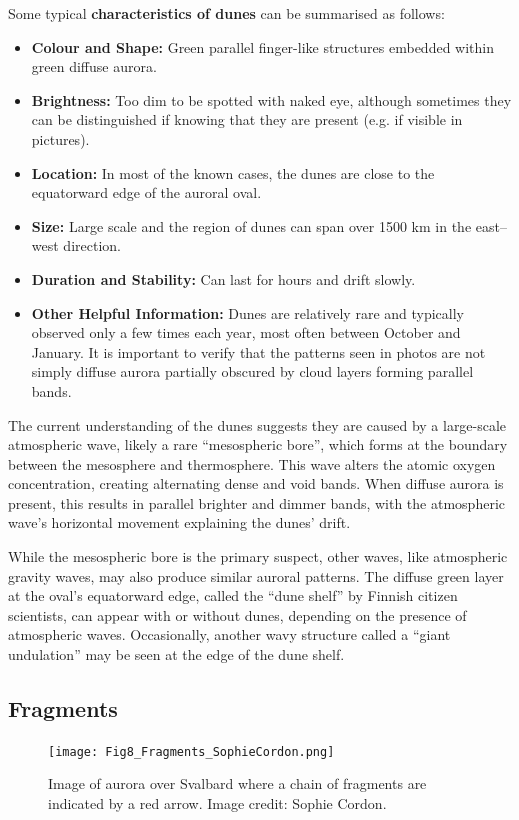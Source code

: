 \documentclass{article}
\newcommand{\contributed}[1]{%
    \par\noindent
    \begingroup
    \setlength{\leftskip}{1em}%
    \itshape
    Contributors: #1
    \par
    \endgroup
    \vspace{0.5em}
}
\begin{document}
Some typical {\bf characteristics of dunes} can be summarised as follows:
\begin{itemize}
    \item \textbf{Colour and Shape:} Green parallel finger-like structures embedded within green diffuse aurora.
    \item \textbf{Brightness:} Too dim to be spotted with naked eye, although sometimes they can be distinguished if knowing that they are present (e.g. if visible in pictures).
    \item \textbf{Location:} In most of the known cases, the dunes are close to the equatorward edge of the auroral oval.
    \item \textbf{Size:} Large scale and the region of dunes can span over 1500 km in the east--west direction.
    \item \textbf{Duration and Stability:} Can last for hours and drift slowly. 
    \item \textbf{Other Helpful Information:} Dunes are relatively rare and typically observed only a few times each year, most often between October and January. It is important to verify that the patterns seen in photos are not simply diffuse aurora partially obscured by cloud layers forming parallel bands.
    \end{itemize}

The current understanding of the dunes suggests they are caused by a large-scale atmospheric wave, likely a rare ``mesospheric bore'', which forms at the boundary between the mesosphere and thermosphere. This wave alters the atomic oxygen concentration, creating alternating dense and void bands. When diffuse aurora is present, this results in parallel brighter and dimmer bands, with the atmospheric wave’s horizontal movement explaining the dunes' drift.

While the mesospheric bore is the primary suspect, other waves, like atmospheric gravity waves, may also produce similar auroral patterns. The diffuse green layer at the oval's equatorward edge, called the ``dune shelf'' by Finnish citizen scientists, can appear with or without dunes, depending on the presence of atmospheric waves. Occasionally, another wavy structure called a ``giant undulation'' may be seen at the edge of the dune shelf.

\subsection{Fragments}\label{fragments}
\begin{figure}
  \texttt{[image: Fig8\_Fragments\_SophieCordon.png]}
  \caption{Image of aurora over Svalbard where a chain of fragments are indicated by a red arrow. Image credit: Sophie Cordon.}
  \label{fragmentsexample}
\end{figure}
\end{document}
